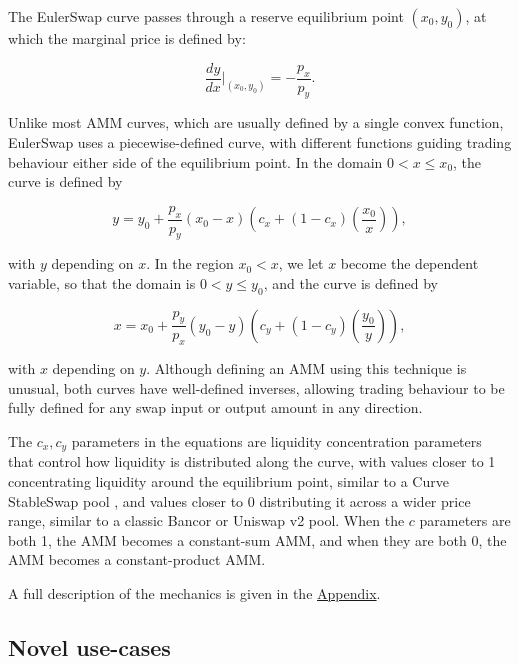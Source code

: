 \documentclass{article}
\begin{document}
The EulerSwap curve passes through a reserve equilibrium point $(x_0, y_0)$, at which the marginal price is defined by:

\begin{equation}
    \frac{dy}{dx} \Big|_{(x_0, y_0)} 
    = 
    -\frac{p_x}{p_y}.
\end{equation}

Unlike most AMM curves, which are usually defined by a single convex function, EulerSwap uses a piecewise-defined curve, with different functions guiding trading behaviour either side of the equilibrium point. In the domain $0 < x \leq x_0$, the curve is defined by

\begin{equation}
\label{eq:euler-swap-main-y}
    y
    =
    y_{0}+\frac{p_{x}}{p_{y}}\left(x_{0}-x\right)\left(c_{x}+\left(1-c_{x}\right)\left(\frac{x_{0}}{x}\right)\right),
\end{equation}

with $y$ depending on $x$. In the region $x_0 < x$, we let $x$ become the dependent variable, so that the domain is $0 < y \leq y_0$, and the curve is defined by

\begin{equation}
\label{eq:euler-swap-main-x}
    x
    =
    x_{0}+\frac{p_{y}}{p_{x}}\left(y_{0}-y\right)\left(c_{y}+\left(1-c_{y}\right)\left(\frac{y_{0}}{y}\right)\right),
\end{equation}

with $x$ depending on $y$. Although defining an AMM using this technique is unusual, both curves have well-defined inverses, allowing trading behaviour to be fully defined for any swap input or output amount in any direction.

The $c_x, c_y$ parameters in the equations are liquidity concentration parameters that control how liquidity is distributed along the curve, with values closer to 1 concentrating liquidity around the equilibrium point, similar to a Curve StableSwap pool \cite{egorovStableSwap}, and values closer to 0 distributing it across a wider price range, similar to a classic Bancor \cite{bancorWhitepaper} or Uniswap v2 \cite{uniswapv2whitepaper} pool. When the $c$ parameters are both 1, the AMM becomes a constant-sum AMM, and when they are both 0, the AMM becomes a constant-product AMM.

A full description of the mechanics is given in the \hyperref[sec:appendix]{Appendix}.

\subsection{Novel use-cases}
\end{document}

